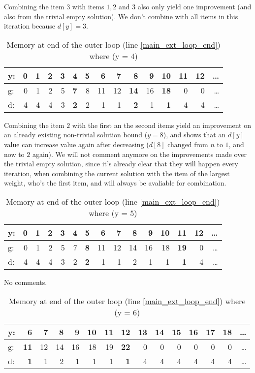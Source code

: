 \documentclass[12pt]{article}
\begin{document}
Combining the item \(3\) with items \(1, 2\) and \(3\) also only yield one improvement (and also from the trivial empty solution). We don't combine with all items in this iteration because \(d[y] = 3\).

\begin{table}[H]
\centering
\caption{Memory at end of the outer loop (line \ref{main_ext_loop_end}) where (y = 4)}
\label{mem_y_4}
\begin{tabular}{l|rrrrrrrrrrrrrr}
y: & 0 &1 &2 &3 &\textbf{4} &5 &6 &7 &\textbf{8} &9 &\textbf{10} &11 &12 &\dots\\
\hline
g: & 0 &1 &2 &5 &\textbf{7} &8 &11 &12 &\textbf{14} &16 &\textbf{18} &0 &0 &\dots\\
d: & 4 & 4 & 4 & 3 & \textbf{2} & 2 & 1 & 1 & \textbf{2} & 1 & \textbf{1} & 4 & 4 & \dots\\
\end{tabular}
\end{table}

Combining the item \(2\) with the first an the second items yield an improvement on an already existing non-trivial solution bound (\(y = 8\)), and shows that an \(d[y]\) value can increase value again after decreasing (\(d[8]\) changed from \(n\) to \(1\), and now to \(2\) again). We will not comment anymore on the improvements made over the trivial empty solution, since it's already clear that they will happen every iteration, when combining the current solution with the item of the largest weight, who's the first item, and will always be avaliable for combination.

\begin{table}[h]
\centering
\caption{Memory at end of the outer loop (line \ref{main_ext_loop_end}) where (y = 5)}
\label{mem_y_5}
\begin{tabular}{l|rrrrrrrrrrrrrr}
y: & 0 &1 &2 &3 &4 &\textbf{5} &6  &7  &8  &9  &10 &\textbf{11} &12 &\dots\\
\hline
g: & 0 &1 &2 &5 &7 &\textbf{8} &11 &12 &14 &16 &18 &\textbf{19} &0 &\dots\\
d: & 4 & 4 & 4 & 3 & 2 & \textbf{2}& 1 & 1 & 2 & 1 & 1 & \textbf{1} & 4 & \dots\\
\end{tabular}
\end{table}

No comments.

\begin{table}[h]
\centering
\caption{Memory at end of the outer loop (line \ref{main_ext_loop_end}) where (y = 6)}
\label{mem_y_6}
\begin{tabular}{l|rrrrrrrrrrrrrr}
y: & \textbf{6} &7   &8  &9  &10 &11 &\textbf{12} &13 &14 &15 &16 &17 &18 &\dots\\
\hline
g: & \textbf{11} &12 &14 &16 &18 &19 &\textbf{22} &0 &0 &0 &0 &0 &0 &\dots\\
d: & \textbf{1} & 1  & 2 & 1 & 1 & 1 & \textbf{1} & 4& 4 & 4 & 4 & 4 & 4 & \dots\\
\end{tabular}
\end{table}
\end{document}
